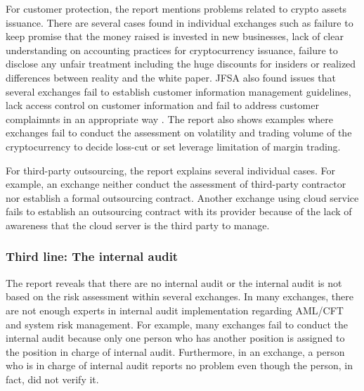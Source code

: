 For customer protection, the report mentions problems related to crypto assets issuance. There are several cases found in individual exchanges such as %
failure to keep promise that the money raised is invested in new businesses, lack of clear understanding on accounting practices for cryptocurrency issuance, failure to disclose any unfair treatment including the huge discounts for insiders or realized differences between reality and the white paper. %
JFSA also found issues that several exchanges fail to establish customer information management guidelines, %
lack access control on customer information and fail to address customer complaimnts in an appropriate way%
.
The report also shows examples where exchanges fail to conduct the assessment on volatility and trading volume of the cryptocurrency to decide loss-cut or set leverage limitation of margin trading.

For third-party outsourcing, the report explains several individual cases. For example, an exchange neither conduct the assessment of third-party contractor nor establish a formal outsourcing contract. %
Another exchange using cloud service fails to establish an outsourcing contract with its provider because of the lack of awareness that the cloud server is the third party to manage.

\subsubsection{Third line: The internal audit}
The report reveals that there are no internal audit or the internal audit is not based on the risk assessment within several exchanges. In many exchanges, there are not enough experts in internal audit implementation regarding AML/CFT and system risk management. For example, many exchanges fail to conduct the internal audit%
because only one person who has another position is assigned to the position in charge of internal audit. %
Furthermore, in an exchange, a person who is in charge of internal audit reports no problem even though the person, in fact, did not verify it.

